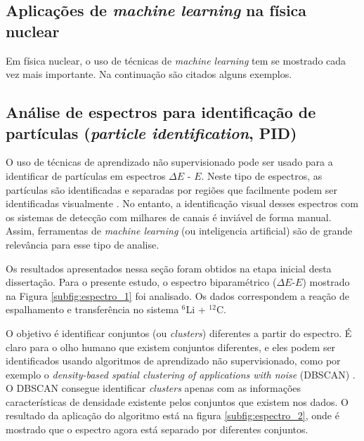 \documentclass[a4paper,12pt,oneside]{book}
\begin{document}
\begin{appendices}


\chapter{Aplicações de \textit{machine learning} na física nuclear} \label{appendix:ml_nuclear}

\par Em física nuclear, o uso de técnicas de \textit{machine learning} tem se mostrado cada vez mais importante. Na continuação são citados alguns exemplos.

\section{Análise de espectros para identificação de partículas (\textit{particle identification}, PID)}

\par O uso de técnicas de aprendizado não supervisionado pode ser usado para a identificar de partículas em espectros $\Delta E$ - $E$. Neste tipo de espectros, as partículas são identificadas e separadas por regiões que facilmente podem ser identificadas visualmente \cite{DETC_TELE}. No entanto, a identificação visual desses espectros com os sistemas de detecção com milhares de canais é inviável de forma manual. Assim, ferramentas de \textit{machine learning} (ou inteligencia artificial) são de grande relevância para esse tipo de analise.

Os resultados apresentados nessa seção foram obtidos na etapa inicial desta dissertação. Para o presente estudo, o espectro biparamétrico ($\Delta E$-$E$) mostrado na Figura \ref{subfig:espectro_1} foi analisado. Os dados correspondem a reação de espalhamento e transferência no sistema $^{6}$Li +  $^{12}$C.



\par O objetivo é identificar conjuntos (ou \textit{clusters}) diferentes a partir do espectro. É claro para o olho humano que existem conjuntos diferentes, e eles podem ser identificados usando algoritmos de aprendizado não supervisionado, como por exemplo o \textit{density-based spatial clustering of applications with noise} (DBSCAN) \cite{dbscan}. O DBSCAN consegue identificar \textit{clusters} apenas com as informações características de densidade existente pelos conjuntos que existem nos dados. O resultado da aplicação do algoritmo está na figura \ref{subfig:espectro_2}, onde é mostrado que o espectro agora está separado por diferentes conjuntos.


\end{appendices}
\end{document}
